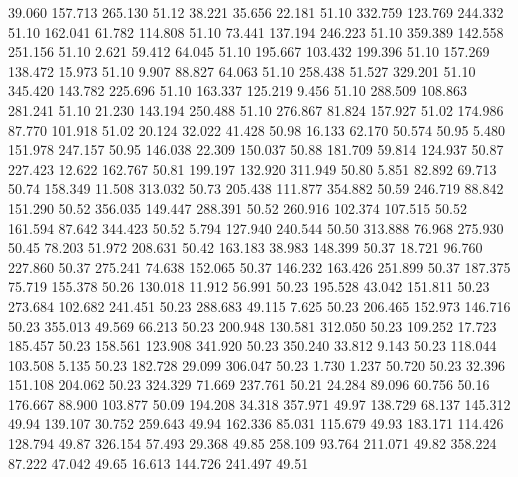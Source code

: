   39.060  157.713  265.130        51.12
  38.221   35.656   22.181        51.10
 332.759  123.769  244.332        51.10
 162.041   61.782  114.808        51.10
  73.441  137.194  246.223        51.10
 359.389  142.558  251.156        51.10
   2.621   59.412   64.045        51.10
 195.667  103.432  199.396        51.10
 157.269  138.472   15.973        51.10
   9.907   88.827   64.063        51.10
 258.438   51.527  329.201        51.10
 345.420  143.782  225.696        51.10
 163.337  125.219    9.456        51.10
 288.509  108.863  281.241        51.10
  21.230  143.194  250.488        51.10
 276.867   81.824  157.927        51.02
 174.986   87.770  101.918        51.02
  20.124   32.022   41.428        50.98
  16.133   62.170   50.574        50.95
   5.480  151.978  247.157        50.95
 146.038   22.309  150.037        50.88
 181.709   59.814  124.937        50.87
 227.423   12.622  162.767        50.81
 199.197  132.920  311.949        50.80
   5.851   82.892   69.713        50.74
 158.349   11.508  313.032        50.73
 205.438  111.877  354.882        50.59
 246.719   88.842  151.290        50.52
 356.035  149.447  288.391        50.52
 260.916  102.374  107.515        50.52
 161.594   87.642  344.423        50.52
   5.794  127.940  240.544        50.50
 313.888   76.968  275.930        50.45
  78.203   51.972  208.631        50.42
 163.183   38.983  148.399        50.37
  18.721   96.760  227.860        50.37
 275.241   74.638  152.065        50.37
 146.232  163.426  251.899        50.37
 187.375   75.719  155.378        50.26
 130.018   11.912   56.991        50.23
 195.528   43.042  151.811        50.23
 273.684  102.682  241.451        50.23
 288.683   49.115    7.625        50.23
 206.465  152.973  146.716        50.23
 355.013   49.569   66.213        50.23
 200.948  130.581  312.050        50.23
 109.252   17.723  185.457        50.23
 158.561  123.908  341.920        50.23
 350.240   33.812    9.143        50.23
 118.044  103.508    5.135        50.23
 182.728   29.099  306.047        50.23
   1.730    1.237   50.720        50.23
  32.396  151.108  204.062        50.23
 324.329   71.669  237.761        50.21
  24.284   89.096   60.756        50.16
 176.667   88.900  103.877        50.09
 194.208   34.318  357.971        49.97
 138.729   68.137  145.312        49.94
 139.107   30.752  259.643        49.94
 162.336   85.031  115.679        49.93
 183.171  114.426  128.794        49.87
 326.154   57.493   29.368        49.85
 258.109   93.764  211.071        49.82
 358.224   87.222   47.042        49.65
  16.613  144.726  241.497        49.51

